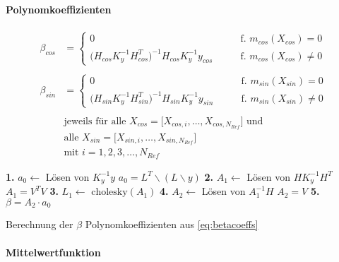 \paragraph*{Polynomkoeffizienten}


\begin{align}\label{eq:betacoeffs}
	\beta_{cos} &= 
		\begin{cases}
			0 																	 &\qquad \text{f. } m_{cos}(X_{cos}) = 0\\
			\big( H_{cos} K_y^{-1} H_{cos}^T \big)^{-1} H_{cos} K_y^{-1} y_{cos} &\qquad \text{f. } m_{cos}(X_{cos}) \ne 0
		\end{cases} \nonumber \\
	\\
	\beta_{sin} &= 
		\begin{cases}
			0 																	 &\qquad \text{f. } m_{sin}(X_{sin}) = 0\\
			\big( H_{sin} K_y^{-1} H_{sin}^T \big)^{-1} H_{sin} K_y^{-1} y_{sin} &\qquad \text{f. } m_{sin}(X_{sin}) \ne 0
		\end{cases} \nonumber \\
	\nonumber \\
	& \text{jeweils für alle } X_{cos} = \big[ X_{cos,i},\dots, X_{cos,N_{Ref}} \big] \text{ und } \nonumber \\
	& \text{alle } X_{sin} = \big[ X_{sin,i},\dots, X_{sin,N_{Ref}} \big] \nonumber \\
	& \text{mit } i = 1,2,3,\ldots,N_{Ref} \nonumber
\end{align}


\begin{algorithm}
	\SetAlgoLined
	\textbf{1.} $a_0 \leftarrow$ Lösen von $K_y^{-1} y$\;
	\Indp 
		$a_0 = L^T \backslash (L \backslash y)$\;
	\Indm
	\textbf{2.} $A_1 \leftarrow$ Lösen von $H K_y^{-1} H^T$\;
	\Indp
		$A_1 = V^T V$\;
	\Indm
	\textbf{3.} $L_1 \leftarrow$ $\text{cholesky}(A_1)$\;
	\textbf{4.} $A_2 \leftarrow$ Lösen von $A_1^{-1} H$\;
	\Indp
		$A_2 = V$\;
	\Indm
	\textbf{5.} $\beta = A_2 \cdot a_0$
	\caption{Berechnung der $\beta$ Polynomkoeffizienten aus \autoref{eq:betacoeffs}}
	\label{alg:beta-koeffs}
\end{algorithm}


\paragraph*{Mittelwertfunktion}


